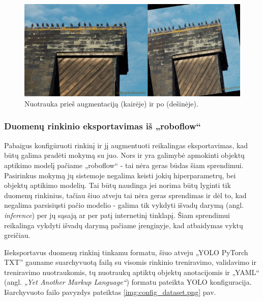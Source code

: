 \documentclass{VUMIFPSkursinis}
\begin{document}
\begin{figure}[H]
    \centering
    \includegraphics[width=1\textwidth]{img/imgformat.jpg}
    \caption{Nuotrauka prieš augmentaciją (kairėje) ir po (dešinėje).}
    \label{img:mergedaug}
\end{figure}

\subsubsection{Duomenų rinkinio eksportavimas iš „roboflow“}
Pabaigus konfigūruoti rinkinį ir jį augmentuoti reikalingas eksportavimas, kad būtų galima pradėti mokymą su juo. Nors ir yra galimybė apmokinti objektų aptikimo modelį pačiame „roboflow“ - tai nėra geras būdas šiam sprendimui. Pasirinkus mokymą jų sistemoje negalima keisti jokių hiperparametrų, bei objektų aptikimo modelių. Tai būtų naudinga jei norima būtų lyginti tik duomenų rinkinius, tačiau šiuo atveju tai nėra geras sprendimas ir dėl to, kad negalima parsisiųsti pačio modelio - galima tik vykdyti išvadų darymą (angl. \emph{inference}) per jų sąsają ar per patį internetinį tinklapį. Šiam sprendimui reikalinga vykdyti išvadų darymą pačiame įrenginyje, kad atbaidymas vyktų greičiau.

Išeksportavus duomenų rinkinį tinkamu formatu, šiuo atveju „YOLO PyTorch TXT” gauname suarchyvuotą failą su visomis rinkinio treniravimo, validavimo ir treniravimo nuotraukomis, tų nuotraukų aptiktų objektų anotacijomis ir „YAML“ (angl. \emph{„Yet Another Markup Language“}) formatu pateikta YOLO konfiguracija. Išarchyvuoto failo pavyzdys pateiktas \ref{img:config_dataset.png} pav.
\end{document}
